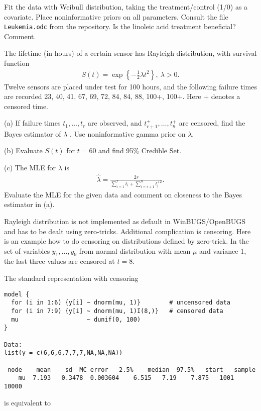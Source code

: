 \documentclass[12pt]{article}
\newcommand{\ba}{\begin{eqnarray*}}
\newcommand{\ea}{\end{eqnarray*}}
\begin{document}
 Fit the data with Weibull distribution, taking the treatment/control (1/0) as a covariate.
 Place noninformative priors on all parameters. Consult the file {\tt Leukemia.odc} from the repository.
 Is the linoleic acid treatment beneficial? Comment.




\vspace*{0.2in}

%
 The lifetime (in hours) of a certain sensor has
Rayleigh distribution, with survival function
\ba
S(t) = \exp\left\{ -\frac{1}{2} \lambda t^2\right\},~\lambda > 0.
\ea
Twelve sensors are placed under test for 100 hours, and the following
failure times are recorded
23, 40, 41, 67, 69, 72, 84, 84, 88, 100+, 100+.
Here + denotes a censored time.

(a) If failure times $t_1, \dots, t_r$ are observed, and $t_{r+1}^+, \dots, t_{n}^+$
are censored,  find the Bayes estimator of $\lambda$ . Use noninformative gamma prior on $\lambda.$


(b) Evaluate $S(t)$ for $t=60$ and find 95\% Credible Set.

(c) The MLE for $\lambda$ is
\ba
\hat \lambda = \frac{ 2 r }{\sum_{i=1}^r t_i + \sum_{i=r+1}^n t^{+2}_i }.
\ea
Evaluate the MLE for the given data and comment on closeness to the Bayes estimator in (a).

\vspace*{0.2in}
 Rayleigh distribution is not implemented as default in
WinBUGS/OpenBUGS and has to be dealt using zero-tricks. Additional complication is censoring.
Here is an example how to do censoring on distributions defined by
zero-trick. In the set of variables $y_1, \dots, y_9$ from normal distribution
with mean $\mu$ and variance 1, the last three values
are censored at $ t=8.$

The standard representation with censoring
\begin{verbatim}
model {
  for (i in 1:6) {y[i] ~ dnorm(mu, 1)}        # uncensored data
  for (i in 7:9) {y[i] ~ dnorm(mu, 1)I(8,)}   # censored data
  mu                   ~ dunif(0, 100)
}

Data:
list(y = c(6,6,6,7,7,7,NA,NA,NA))

 node	 mean	 sd	 MC error	2.5%	median	97.5%	start	sample
	mu	7.193	0.3478	0.003604	6.515	7.19	7.875	1001	10000
\end{verbatim}

is equivalent to
\end{document}
